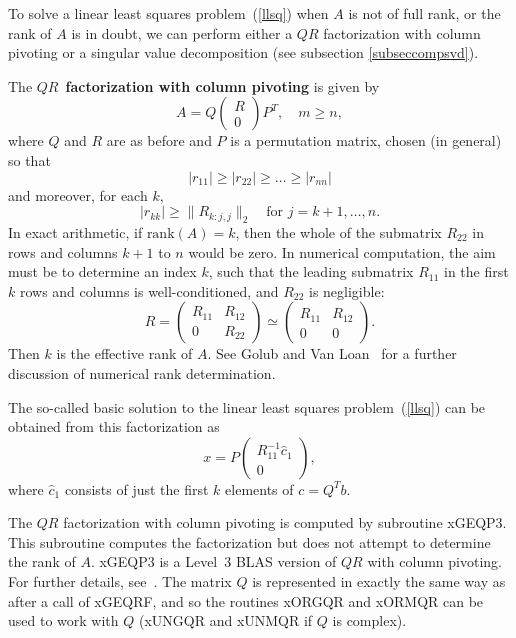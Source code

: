 To solve a linear least squares problem~(\ref{llsq})
when $A$ is not of full rank, or the rank of $A$ is in doubt, we can
perform either a $QR$ factorization with column pivoting
 or a singular value
decomposition (see subsection \ref{subseccompsvd}).

The {\boldmath $QR$}~{\bf factorization with column pivoting} is given by
\[
A = Q\left( \begin{array}{c}R\\0\end{array}\right)P^T, \quad m \ge n,
\]
where $Q$ and $R$ are as before and $P$ is a permutation matrix, chosen
(in general) so that
\[
|r_{11}| \ge |r_{22}| \ge \ldots \ge |r_{nn}|
\]
and moreover, for each $k$,
\[
|r_{kk}| \ge \|R_{k:j,j}\|_2 \quad \mbox{for $j = k+1, \ldots, n$.}
\]
In exact arithmetic, if $\mbox{rank}(A) = k$, then the whole of the submatrix
$R_{22}$ in rows and columns $k+1$ to $n$
would be zero. In numerical computation, the aim must be to
determine an index $k$, such that the leading submatrix $R_{11}$ in the first
$k$ rows and columns is well-conditioned, and $R_{22}$ is negligible:
\[
R = \left( \begin{array}{cc}R_{11} & R_{12} \\ 0 & R_{22} \end{array}\right)
\simeq \left( \begin{array}{cc}R_{11} & R_{12} \\ 0 & 0\end{array}\right) .
\]
Then $k$ is the effective rank of $A$. See Golub and Van Loan~\cite{GVL2}
for a further discussion of numerical rank determination.

The so-called basic solution to the linear least squares
problem~(\ref{llsq}) can be obtained from this factorization as
\[
x = P \left( \begin{array}{c} R_{11}^{-1} \hat{c}_1 \\ 0 \end{array} \right),
\]
where $\hat{c}_1$ consists of just the first $k$ elements of $c = Q^T b$.

The $QR$ factorization with column pivoting is computed
by subroutine xGEQP3.
This subroutine computes the factorization but does not attempt to
determine the rank of $A$.  xGEQP3 is a Level~3 BLAS version of $QR$ with
column pivoting. For further details, see~\cite{drmacbujanovic08}.
The matrix $Q$ is represented in exactly the same way as after a call of
xGEQRF, and so the
routines xORGQR and xORMQR can be used to work with $Q$
(xUNGQR and xUNMQR if $Q$ is complex).

